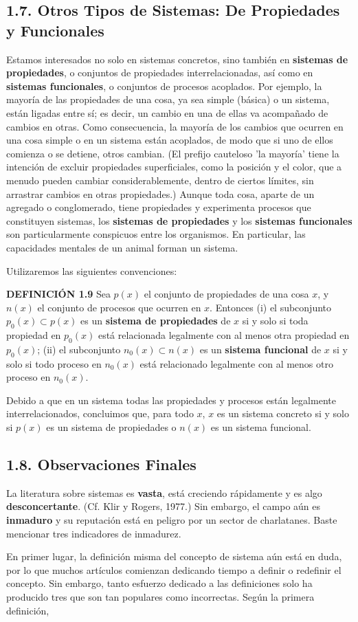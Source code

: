 {\fontsize{13}{15}\selectfont
\subsection*{1.7. Otros Tipos de Sistemas: De Propiedades y Funcionales}
Estamos interesados no solo en sistemas concretos, sino también en \textbf{sistemas de propiedades}, o conjuntos de propiedades interrelacionadas, así como en \textbf{sistemas funcionales}, o conjuntos de procesos acoplados. Por ejemplo, la mayoría de las propiedades de una cosa, ya sea simple (básica) o un sistema, están ligadas entre sí; es decir, un cambio en una de ellas va acompañado de cambios en otras. Como consecuencia, la mayoría de los cambios que ocurren en una cosa simple o en un sistema están acoplados, de modo que si uno de ellos comienza o se detiene, otros cambian. (El prefijo cauteloso 'la mayoría' tiene la intención de excluir propiedades superficiales, como la posición y el color, que a menudo pueden cambiar considerablemente, dentro de ciertos límites, sin arrastrar cambios en otras propiedades.) Aunque toda cosa, aparte de un agregado o conglomerado, tiene propiedades y experimenta procesos que constituyen sistemas, los \textbf{sistemas de propiedades} y los \textbf{sistemas funcionales} son particularmente conspicuos entre los organismos. En particular, las capacidades mentales de un animal forman un sistema.

Utilizaremos las siguientes convenciones:

\textbf{DEFINICIÓN 1.9} Sea $p(x)$ el conjunto de propiedades de una cosa $x$, y $n(x)$ el conjunto de procesos que ocurren en $x$. Entonces
(i) el subconjunto $p_0(x) \subset p(x)$ es un \textbf{sistema de propiedades} de $x$ si y solo si toda propiedad en $p_0(x)$ está relacionada legalmente con al menos otra propiedad en $p_0(x)$;
(ii) el subconjunto $n_0(x) \subset n(x)$ es un \textbf{sistema funcional} de $x$ si y solo si todo proceso en $n_0(x)$ está relacionado legalmente con al menos otro proceso en $n_0(x)$.

Debido a que en un sistema todas las propiedades y procesos están legalmente interrelacionados, concluimos que, para todo $x$, $x$ es un sistema concreto si y solo si $p(x)$ es un sistema de propiedades o $n(x)$ es un sistema funcional.

\subsection*{1.8. Observaciones Finales}
La literatura sobre sistemas es \textbf{vasta}, está creciendo rápidamente y es algo \textbf{desconcertante}. (Cf. Klir y Rogers, 1977.) Sin embargo, el campo aún es \textbf{inmaduro} y su reputación está en peligro por un sector de charlatanes. Baste mencionar tres indicadores de inmadurez.

En primer lugar, la definición misma del concepto de sistema aún está en duda, por lo que muchos artículos comienzan dedicando tiempo a definir o redefinir el concepto. Sin embargo, tanto esfuerzo dedicado a las definiciones solo ha producido tres que son tan populares como incorrectas. Según la primera definición,
}

